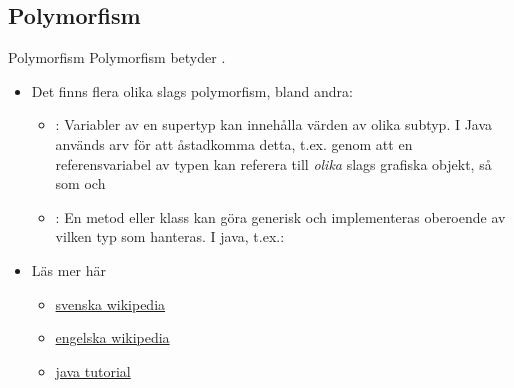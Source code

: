 \documentclass{lecturenotes}
\begin{document}
\subsection{Polymorfism}
\begin{Slide}{Polymorfism}
Polymorfism betyder .
\begin{itemize}\footnotesize
\item Det finns flera olika slags polymorfism, bland andra:
\begin{itemize}\footnotesize
\item {}: Variabler av en supertyp kan innehålla värden av olika subtyp. I Java används arv för att åstadkomma detta, t.ex. genom att en referensvariabel av typen  kan referera till \emph{olika} slags grafiska objekt, så som  och 
\item {}: En metod eller klass kan göra generisk och implementeras oberoende av vilken typ som hanteras. I java, t.ex.: 
\end{itemize}
\item Läs mer här
\begin{itemize}\footnotesize
\item \href{https://sv.wikipedia.org/wiki/Polymorfism_\%28objektorienterad_programmering\%29}{svenska wikipedia}
\item \href{https://en.wikipedia.org/wiki/Polymorphism_\%28computer_science\%29}{engelska wikipedia}
\item \href{http://docs.oracle.com/javase/tutorial/java/IandI/polymorphism.html}{java tutorial}
\end{itemize}
\end{itemize}
\end{Slide}
\end{document}
